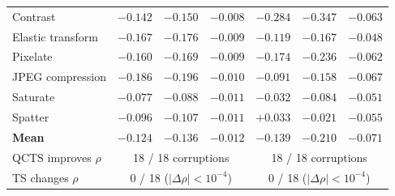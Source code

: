 \begin{table}[!t]
\begin{tabular}{lcccccc}
Contrast         & $-0.142$ & $-0.150$ & $-0.008$ & $-0.284$ & $-0.347$ & $-0.063$ \\
Elastic transform & $-0.167$ & $-0.176$ & $-0.009$ & $-0.119$ & $-0.167$ & $-0.048$ \\
Pixelate         & $-0.160$ & $-0.169$ & $-0.009$ & $-0.174$ & $-0.236$ & $-0.062$ \\
JPEG compression & $-0.186$ & $-0.196$ & $-0.010$ & $-0.091$ & $-0.158$ & $-0.067$ \\
Saturate         & $-0.077$ & $-0.088$ & $-0.011$ & $-0.032$ & $-0.084$ & $-0.051$ \\
Spatter          & $-0.096$ & $-0.107$ & $-0.011$ & $+0.033$ & $-0.021$ & $-0.055$ \\
\midrule
\textbf{Mean}    & $-0.124$ & $-0.136$ & $\mathbf{-0.012}$ & $-0.139$ & $-0.210$ & $\mathbf{-0.071}$ \\
QCTS improves $\rho$  & \multicolumn{3}{c}{18 / 18 corruptions} & \multicolumn{3}{c}{18 / 18 corruptions} \\
TS changes $\rho$     & \multicolumn{3}{c}{0 / 18 ($|\Delta\rho|{<}10^{-4}$)} & \multicolumn{3}{c}{0 / 18 ($|\Delta\rho|{<}10^{-4}$)} \\
\bottomrule
\end{tabular}
\end{table}
